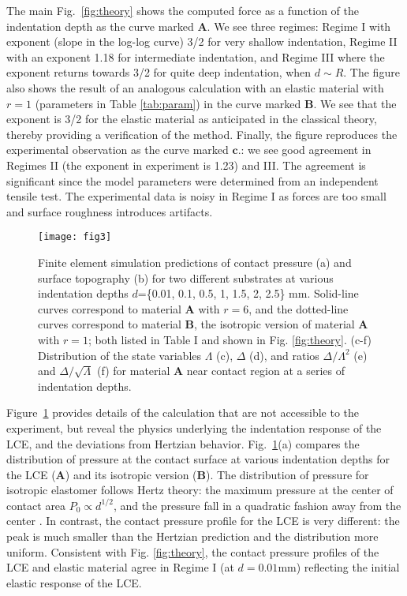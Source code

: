 \documentclass[12pt]{article}
\begin{document}
The main Fig.~\ref{fig:theory} shows the computed force as a function of the indentation depth as the curve marked $\textbf{A}$.  We see three regimes: Regime I with exponent (slope in the log-log curve) 3/2 for very shallow indentation,  Regime II with an exponent 1.18 for intermediate indentation, and Regime III where the exponent returns towards 3/2 for quite deep indentation, when $d \sim R$.  The figure also shows the result of an analogous calculation with an elastic material with $r=1$ (parameters in Table \ref{tab:param}) in the curve marked $\textbf{B}$.  We see that the exponent is 3/2 for the elastic material as anticipated in the classical theory, thereby providing a verification of the method.  Finally, the figure reproduces the experimental observation as the curve marked $\textbf{c.}$: we see good agreement in Regimes II (the exponent in experiment is 1.23) and III. The agreement is significant since the model parameters were determined from an independent tensile test.
The experimental data is noisy in Regime I as forces are too small and surface roughness introduces artifacts.  


\begin{figure}
 \centering
\texttt{[image: fig3]}
\caption{Finite element simulation predictions of contact pressure (a) and surface topography (b) for two different substrates at various indentation depths $d$=\{0.01, 0.1, 0.5, 1, 1.5, 2, 2.5\} mm. Solid-line curves correspond to material $\textbf{A}$ with $r=6$, and the dotted-line curves correspond to material $\textbf{B}$, the isotropic version of material $\textbf{A}$ with $r=1$; both listed in Table I and shown in Fig. \ref{fig:theory}. (c-f) Distribution of the state variables $\Lambda$ (c), $\Delta$ (d), and ratios $\Delta/\Lambda^2$ (e) and $\Delta/\sqrt{\Lambda}$ (f) for material $\textbf{A}$ near contact region at a series of indentation depths.}
\label{fig:pressure}
\end{figure}


Figure~\ref{fig:pressure} provides details of the calculation that are not accessible to the experiment, but reveal the physics underlying the indentation response of the LCE, and the deviations from Hertzian behavior. Fig.~\ref{fig:pressure}(a) compares the distribution of pressure at the contact surface at various indentation depths for the LCE ($\textbf{A}$) and its isotropic version ($\textbf{B}$). The distribution of pressure for isotropic elastomer follows Hertz theory: the maximum pressure at the center of contact area $P_0\propto d^{1/2}$, and the pressure fall in a quadratic fashion away from the center \cite{timoshenko}. In contrast, the contact pressure profile for the LCE is very different: the peak is much smaller than the Hertzian prediction and the distribution more uniform. Consistent with Fig. \ref{fig:theory}, the contact pressure profiles of the LCE and elastic material agree in Regime I (at $d=0.01$mm)  reflecting the initial elastic response of the LCE.
\end{document}
